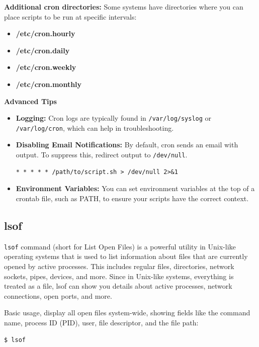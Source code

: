 \documentclass{article}
\newenvironment{codetemplate}[1][]{%
  \mybasecolorbox[#1]
  \itshape
}{%
  \endmybasecolorbox
}
\begin{document}
\textbf{Additional cron directories:}  Some systems have directories where you can place scripts to be run at specific intervals:

\begin{itemize}
    \item \textbf{/etc/cron.hourly}
    \item \textbf{/etc/cron.daily}
    \item \textbf{/etc/cron.weekly}
    \item \textbf{/etc/cron.monthly}
\end{itemize}

\textbf{Advanced Tips}
\begin{itemize}
    \item \textbf{Logging:} Cron logs are typically found in \verb|/var/log/syslog| or \verb|/var/log/cron|, which can help in troubleshooting.
    \item \textbf{Disabling Email Notifications:}  By default, cron sends an email with output. To suppress this, redirect output to \verb|/dev/null|.
\begin{codetemplate}{}
\begin{verbatim}
* * * * * /path/to/script.sh > /dev/null 2>&1
\end{verbatim}
\end{codetemplate}

    \item \textbf{Environment Variables:} You can set environment variables at the top of a crontab file, such as PATH, to ensure your scripts have the correct context.
\end{itemize} 

\subsection{lsof}
\verb|lsof| command (short for List Open Files) is a powerful utility in Unix-like operating systems that is used to list information about files that are currently opened by active processes. This includes regular files, directories, network sockets, pipes, devices, and more. Since in Unix-like systems, everything is treated as a file, lsof can show you details about active processes, network connections, open ports, and more.

Basic usage, display all open files system-wide, showing fields like the command name, process ID (PID), user, file descriptor, and the file path:
\begin{codetemplate}{}
\begin{verbatim}
$ lsof 
\end{verbatim}
\end{codetemplate}
\end{document}
